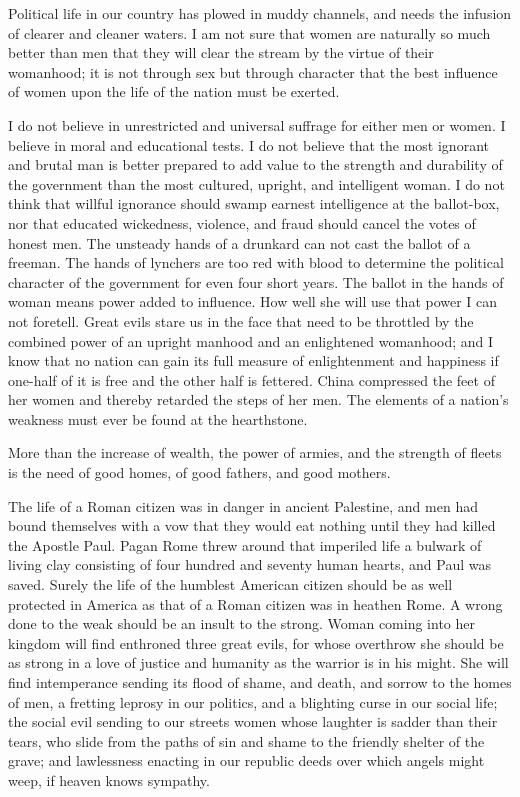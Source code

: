 \documentclass{article}
\begin{document}
Political life in our country has plowed in muddy channels, and needs the
infusion of clearer and cleaner waters. I am not sure that women are naturally
so much better than men that they will clear the stream by the virtue of their
womanhood; it is not through sex but through character that the best influence
of women upon the life of the nation must be exerted.

I do not believe in unrestricted and universal suffrage for either men or
women. I believe in moral and educational tests. I do not believe that the most
ignorant and brutal man is better prepared to add value to the strength and
durability of the government than the most cultured, upright, and intelligent
woman. I do not think that willful ignorance should swamp earnest intelligence
at the ballot-box, nor that educated wickedness, violence, and fraud should
cancel the votes of honest men. The unsteady hands of a drunkard can not cast
the ballot of a freeman. The hands of lynchers are too red with blood to
determine the political character of the government for even four short years.
The ballot in the hands of woman means power added to influence. How well she
will use that power I can not foretell. Great evils stare us in the face that
need to be throttled by the combined power of an upright manhood and an
enlightened womanhood; and I know that no nation can gain its full measure of
enlightenment and happiness if one-half of it is free and the other half is
fettered. China compressed the feet of her women and thereby retarded the steps
of her men. The elements of a nation’s weakness must ever be found at the
hearthstone.

More than the increase of wealth, the power of armies, and the strength of
fleets is the need of good homes, of good fathers, and good mothers.

The life of a Roman citizen was in danger in ancient Palestine, and men had
bound themselves with a vow that they would eat nothing until they had killed
the Apostle Paul. Pagan Rome threw around that imperiled life a bulwark of
living clay consisting of four hundred and seventy human hearts, and Paul was
saved. Surely the life of the humblest American citizen should be as well
protected in America as that of a Roman citizen was in heathen Rome. A wrong
done to the weak should be an insult to the strong. Woman coming into her
kingdom will find enthroned three great evils, for whose overthrow she should
be as strong in a love of justice and humanity as the warrior is in his might.
She will find intemperance sending its flood of shame, and death, and sorrow to
the homes of men, a fretting leprosy in our politics, and a blighting curse in
our social life; the social evil sending to our streets women whose laughter is
sadder than their tears, who slide from the paths of sin and shame to the
friendly shelter of the grave; and lawlessness enacting in our republic deeds
over which angels might weep, if heaven knows sympathy.
\end{document}

